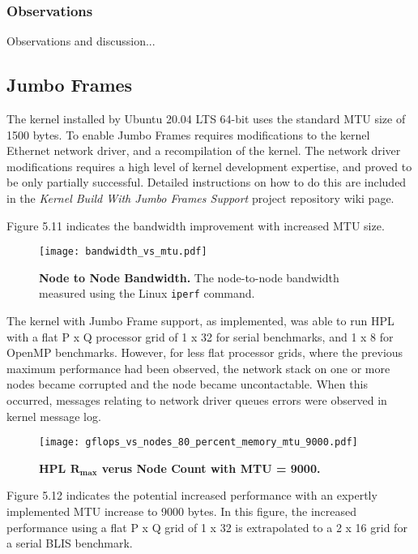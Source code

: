 \subsubsection{Observations}

Observations and discussion...


%
%
\subsection{Jumbo Frames}

The kernel installed by Ubuntu 20.04 LTS 64-bit uses the standard MTU size of 1500 bytes. To enable Jumbo Frames requires modifications to the kernel Ethernet network driver, and a recompilation of the kernel. The network driver modifications requires a high level of kernel development expertise, and proved to be only partially successful. Detailed instructions on how to do this are included in the \emph{Kernel Build With Jumbo Frames Support} project repository wiki page.

Figure 5.11 indicates the bandwidth improvement with increased MTU size.

\begin{figure}[H]
	\centering	
	\texttt{[image: bandwidth\_vs\_mtu.pdf]}
	\caption{\textbf{Node to Node Bandwidth.} The node-to-node bandwidth measured using the Linux \texttt{iperf} command.}
\end{figure}

The kernel with Jumbo Frame support, as implemented, was able to run HPL with a flat P x Q processor grid of 1 x 32 for serial benchmarks, and 1 x 8 for OpenMP benchmarks. However, for less flat processor grids, where the previous maximum performance had been observed, the network stack on one or more nodes became corrupted and the node became uncontactable. When this occurred, messages relating to network driver queues errors were observed in kernel message log.

\begin{figure}
	\centering	
	\texttt{[image: gflops\_vs\_nodes\_80\_percent\_memory\_mtu\_9000.pdf]}
	\caption{\textbf{HPL $\mathbf{R_{max}}$ verus Node Count with MTU = 9000.}}
\end{figure}

Figure 5.12 indicates the potential increased performance with an expertly implemented MTU increase to 9000 bytes. In this figure, the increased performance using a flat P x Q grid of 1 x 32 is extrapolated to a 2 x 16 grid for a serial BLIS benchmark.


